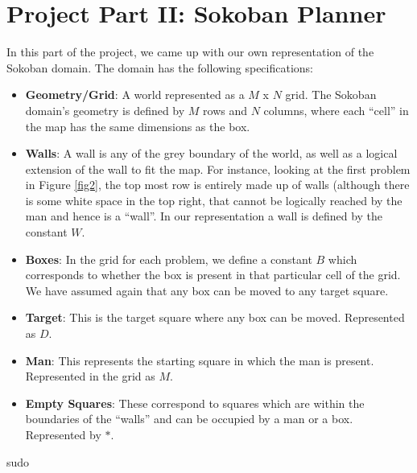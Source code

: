 \documentclass[10pt, letter]{article}
\begin{document}
\section{Project Part II: Sokoban Planner}
In this part of the project, we came up with our own representation of the Sokoban domain. The domain has the following specifications:
\begin{itemize}
	\item \textbf{Geometry/Grid}: A world represented as a $M$ x $N$ grid. The Sokoban domain's geometry is defined by $M$ rows and $N$ columns, where each ``cell'' in the map has the same dimensions as the box.
	\item \textbf{Walls}: A wall is any of the grey boundary of the world, as well as a logical extension of the wall to fit the map. For instance, looking at the first problem in Figure \ref{fig2}, the top most row is entirely made up of walls (although there is some white space in the top right, that cannot be logically reached by the man and hence is a ``wall''. In our representation a wall is defined by the constant $W$.
	\item \textbf{Boxes}: In the grid for each problem, we define a constant $B$ which corresponds to whether the box is present in that particular cell of the grid. We have assumed again that any box can be moved to any target square.
	\item \textbf{Target}: This is the target square where any box can be moved. Represented as $D$.
	\item \textbf{Man}: This represents the starting square in which the man is present. Represented in the grid as $M$.
	\item \textbf{Empty Squares}: These correspond to squares which are within the boundaries of the ``walls'' and can be occupied by a man or a box. Represented by $*$.
\end{itemize}

sudo 
\end{document}
